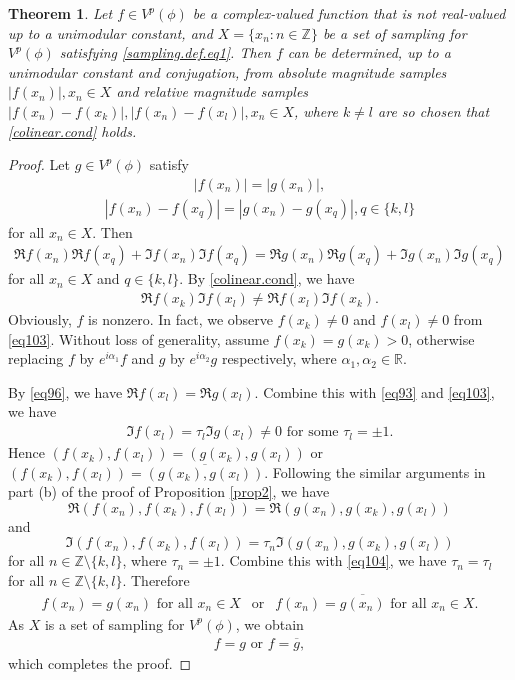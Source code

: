 \documentclass[12pt,oneside,reqno]{amsart}
\newtheorem{theorem}{Theorem}[section]
\newcommand{\Z}{\mathbb{Z}}
\newcommand{\R}{\mathbb{R}}
\numberwithin{equation}{section}
\begin{document}
	
	\begin{theorem}\label{complete.cpr.thm1}
		Let $f\in V^p(\phi)$ be a complex-valued function that is not real-valued up to a unimodular constant,  and $X=\{x_n:n\in \Z\}$ be a set of sampling for $V^p(\phi)$ satisfying \eqref{sampling.def.eq1}. Then $f$  can be determined, up to a unimodular constant and conjugation, from absolute magnitude samples $ |f(x_n)|, x_n\in X $ and relative magnitude samples $  |f(x_{n})-f(x_k)|, |f(x_{n})-f(x_l)|, x_n\in X$, where  $k\ne l$ are so chosen that \eqref{colinear.cond} holds.
	\end{theorem}
	\begin{proof}
		Let $g\in V^p(\phi)$ satisfy 
		\begin{align}\label{eq93}
			|f(x_n)| = |g(x_n)|,
		\end{align}
		\begin{align*}
			|f(x_{n}) - f(x_q)| = |g(x_{n}) - g(x_q)|, q\in \{k,l\}
		\end{align*}
		for all $x_n\in X$.
		Then
		\begin{align}\label{eq96}
			\Re f(x_{n}) \Re f(x_{q}) + \Im f(x_{n}) \Im f(x_{q}) = \Re g(x_{n}) \Re g(x_{q}) + \Im g(x_{n}) \Im g(x_{q})
		\end{align}
		for all $x_n\in X$ and $q\in \{k,l\}$.
		By \eqref{colinear.cond}, we have
		\begin{align}\label{eq103}
			\Re f(x_{k}) \Im f(x_{l}) \ne \Re f(x_{l}) \Im f(x_{k}).
		\end{align}
		Obviously, $f$ is nonzero. In fact, we observe $f(x_{k})\ne 0$ and $f(x_{l})\ne 0$ from \eqref{eq103}.
		Without loss of generality, assume $f(x_{k})= g(x_{k}) >0$, otherwise replacing $f$ by $ e^{i\alpha_1}f $ and $g$ by $ e^{i\alpha_2}g $ respectively, where $\alpha_1, \alpha_2\in \R$.
		
		By \eqref{eq96}, we have $\Re f(x_{l}) = \Re g(x_{l})$. Combine this with \eqref{eq93} and \eqref{eq103}, we have
		\begin{align}\label{eq104}
			\Im f(x_{l}) = \tau_l \Im g(x_{l}) \ne 0 \text{ for some } \tau_l = \pm 1.
		\end{align}
		Hence $(f(x_{k}), f(x_{l}))=(g(x_{k}), g(x_{l}))$ or $(f(x_{k}), f(x_{l}))=\overline{(g(x_{k}), g(x_{l}))}$. Following the  similar  arguments in part (b) of the proof of Proposition \ref{prop2}, we have 
		$$\Re (f(x_{n}), f(x_{k}), f(x_{l}) ) = \Re (g(x_{n}), g(x_{k}), g(x_{l}))$$ and $$\Im (f(x_{n}), f(x_{k}), f(x_{l}))= \tau_n \Im (g(x_{n}), g(x_{k}), g(x_{l}))$$ for all $n\in \Z \setminus \{k,l\}$, where $\tau_n=\pm 1$.
        Combine this with \eqref{eq104}, we have $\tau_n=\tau_l$ for all $n\in \Z \setminus \{k,l\}$. Therefore 
		\begin{align*}
			f(x_n)=g(x_n) \text{ for all } x_n\in X \ \ \text{ or }  \ \ f(x_n)=\overline{g(x_n)} \text{ for all } x_n\in X.
		\end{align*}
		As $X$ is a set of sampling for $V^p(\phi)$, we obtain
		\begin{align*}
			f=g \text{ or } f=\overline{g},
		\end{align*}
		which completes  the proof.
	\end{proof}
	
\end{document}
